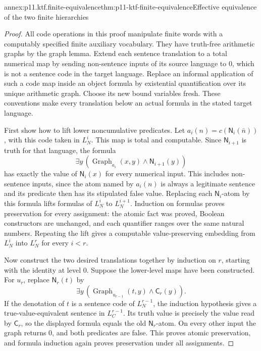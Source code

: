 \begin{annexitem}{annex:p11.ktf.finite-equivalence}{thm:p11-ktf-finite-equivalence}{Effective equivalence of the two finite hierarchies}
\begin{proof}
All code operations in this proof manipulate finite words with a
computably specified finite auxiliary vocabulary. They have truth-free
arithmetic graphs by the graph lemma. Extend each sentence translation
to a total numerical map by sending non-sentence inputs of its source
language to \(0\), which is not a sentence code in the target language.
Replace an informal application of such a code map inside an object
formula by existential quantification over its unique arithmetic graph.
Choose its new bound variables fresh. These conventions make every
translation below an actual formula in the stated target language.

First show how to lift lower noncumulative predicates. Let
\(a_i(n)=c(\mathsf N_i(\bar n))\), with this code taken in
\(L_N^i\). This map is total and computable. Since \(\mathsf N_{i+1}\)
is truth for that language, the formula
\[
 \exists y\,(\operatorname{Graph}_{a_i}(x,y)
                         \land\mathsf N_{i+1}(y))
\]
has exactly the value of \(\mathsf N_i(x)\) for every numerical
input. This includes non-sentence inputs, since the atom named by
\(a_i(n)\) is always a legitimate sentence and its predicate then
has its stipulated false value. Replacing each \(\mathsf N_i\)-atom
by this formula lifts formulas of \(L_N^i\) to \(L_N^{i+1}\).
Induction on formulas proves preservation for every assignment: the
atomic fact was proved, Boolean constructors are unchanged, and each
quantifier ranges over the same natural numbers. Repeating the lift
gives a computable value-preserving embedding from \(L_N^i\) into
\(L_N^r\) for every \(i<r\).

Now construct the two desired translations together by induction on
\(r\), starting with the identity at level \(0\). Suppose the
lower-level maps have been constructed. For \(u_r\), replace
\(\mathsf N_r(t)\) by
\[
 \exists y\,(\operatorname{Graph}_{u_{r-1}}(t,y)
                                      \land\mathsf C_r(y)).
\]
If the denotation of \(t\) is a sentence code of \(L_N^{r-1}\),
the induction hypothesis gives a true-value-equivalent sentence in
\(L_C^{r-1}\). Its truth value is precisely the value read by
\(\mathsf C_r\), so the displayed formula equals the old
\(\mathsf N_r\)-atom. On every other input the graph returns
\(0\), and both predicates are false. This proves atomic preservation,
and formula induction again proves preservation under all assignments.


\end{proof}
\end{annexitem}
